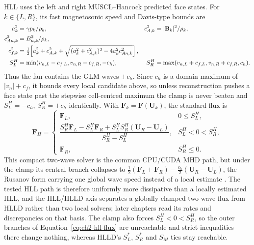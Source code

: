 HLL uses the left and right MUSCL--Hancock predicted face states. For
$k\in\{L,R\}$, its fast magnetosonic speed and Davis-type bounds
\citep{davis_1988} are
\begin{align}
 a_k^2&=\gamma p_k/\rho_k,&
 c_{A,k}^2&=|\mathbf B_k|^2/\rho_k,\notag\\
 c_{An,k}^2&=B_{n,k}^2/\rho_k,\notag\\
 c_{f,k}^2&=\tfrac12\!\left[a_k^2+c_{A,k}^2+
 \sqrt{(a_k^2+c_{A,k}^2)^2-4a_k^2c_{An,k}^2}\right],\notag\\
 S_L^{H}&=\min(v_{n,L}-c_{f,L},v_{n,R}-c_{f,R},-c_h),&
 S_R^{H}&=\max(v_{n,L}+c_{f,L},v_{n,R}+c_{f,R},c_h).
 \label{eq:ch2-hll-speeds}
\end{align}
Thus the fan contains the GLM waves $\pm c_h$. Since $c_h$ is a domain maximum
of $|v_n|+c_f$, it bounds every local candidate above, so unless
reconstruction pushes a face state past the stepwise cell-centred maximum the
clamp is never beaten and $S_L^{H}=-c_h$, $S_R^{H}=+c_h$ identically. With
$\mathbf F_k=\mathbf F(\mathbf U_k)$, the standard flux is
\begin{equation}
 \mathbf F_{H}=\begin{cases}
 \mathbf F_L,&0\le S_L^{H},\\
 \dfrac{S_R^{H}\mathbf F_L-S_L^{H}\mathbf F_R+
 S_L^{H}S_R^{H}(\mathbf U_R-\mathbf U_L)}{S_R^{H}-S_L^{H}},
   &S_L^{H}<0<S_R^{H},\\
 \mathbf F_R,&S_R^{H}\le0.
 \end{cases}
 \label{eq:ch2-hll-flux}
\end{equation}
This compact two-wave solver \citep{harten_lax_vanleer_1983} is the common
CPU/CUDA MHD path, but under the clamp its central branch collapses to
$\tfrac12(\mathbf F_L+\mathbf F_R)-\tfrac{c_h}{2}(\mathbf U_R-\mathbf U_L)$,
the Rusanov form \citep{toro2009} carrying one global wave speed instead of a
local estimate \citep{einfeldt_1988}. The tested HLL path is therefore
uniformly more dissipative than a locally estimated HLL, and the HLL/HLLD axis
separates a globally clamped two-wave flux from HLLD rather than two local
solvers; later chapters read its rates and discrepancies on that basis. The
clamp also forces $S_L^{H}<0<S_R^{H}$, so the outer branches of
Equation~\ref{eq:ch2-hll-flux} are unreachable and strict inequalities there
change nothing, whereas HLLD's $S_L^*$, $S_R^*$ and $S_M$ ties stay reachable.

